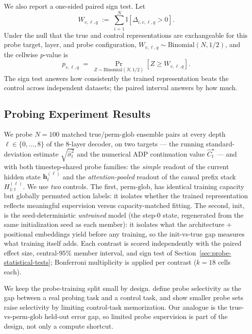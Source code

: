 \documentclass[11pt]{article}
\begin{document}
We also report a one-sided paired sign test. Let
\[
W_{v,\ell,q}
\;:=\;
\sum_{i=1}^N \mathbb{I}\!\left[\Delta_{i,v,\ell,q} > 0\right].
\]
Under the null that the true and control representations are exchangeable for this probe target, layer, and probe configuration, $W_{v,\ell,q} \sim \mathrm{Binomial}(N,1/2)$, and the cellwise $p$-value is
\[
p_{v,\ell,q}
\;=\;
\Pr_{Z\sim\mathrm{Binomial}(N,1/2)}[Z \ge W_{v,\ell,q}].
\]
The sign test answers how consistently the trained representation beats the control across independent datasets; the paired interval answers by how much.

\subsection{Probing Experiment Results}
\label{sec:probe-experiments}

We probe $N=100$ matched true/$\mathrm{perm\text{-}glob}$ ensemble pairs at every depth $\ell\in\{0,\ldots,8\}$ of the 8-layer decoder, on two targets --- the running standard-deviation estimate $\sqrt{\hat\sigma_t^2}$ and the numerical ADP continuation value $\widehat C_t^\star$ --- and with both timestep-shared probe families: the \emph{simple} readout of the current hidden state $\mathbf h_t^{(\ell)}$ and the \emph{attention-pooled} readout of the causal prefix stack $H_{1:t}^{(\ell)}$. We use \emph{two} controls. The first, $\mathrm{perm\text{-}glob}$, has identical training capacity but globally permuted action labels: it isolates whether the trained representation reflects meaningful supervision versus capacity-matched fitting. The second, $\mathrm{init}$, is the seed-deterministic \emph{untrained} model (the step-0 state, regenerated from the same initialization seed as each member): it isolates what the architecture + positional embeddings yield before any training, so the $\mathrm{init}$-vs-$\mathrm{true}$ gap measures what training itself adds. Each contrast is scored independently with the paired effect size, central-$95\%$ member interval, and sign test of Section~\ref{sec:probe-statistical-tests}; Bonferroni multiplicity is applied per contrast ($k=18$ cells each).

We keep the probe-training split small by design. \citet{hewittDesigningInterpretingProbes2019} define probe selectivity as the gap between a real probing task and a control task, and show smaller probe sets raise selectivity by limiting control-task memorization. Our analogue is the true-vs-$\mathrm{perm\text{-}glob}$ held-out error gap, so limited probe supervision is part of the design, not only a compute shortcut.
\end{document}
